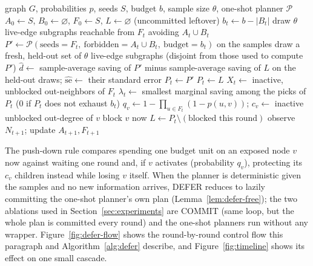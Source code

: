 \documentclass[11pt]{article}
\theoremstyle{definition}
\theoremstyle{remark}
\begin{document}
\begin{algorithm}[h]
\caption{DEFER}\label{alg:defer}
\begin{algorithmic}[1]
\Require graph $G$, probabilities $p$, seeds $S$, budget $b$, sample size
  $\theta$, one-shot planner $\mathcal P$
\State $A_0\gets S$, $B_0\gets\varnothing$, $F_0\gets S$, $L\gets\varnothing$ (uncommitted leftover)
  \State $b_t\gets b-|B_t|$
  \State draw $\theta$ live-edge subgraphs reachable from $F_t$ avoiding $A_t\cup B_t$
  \State $P'\gets\mathcal P(\text{seeds}=F_t,\ \text{forbidden}=A_t\cup B_t,\ \text{budget}=b_t)$ on the samples
  \State draw a fresh, held-out set of $\theta$ live-edge subgraphs (disjoint from those used to compute $P'$)
  \State $\hat d\gets$ sample-average saving of $P'$ minus sample-average saving of $L$ on the held-out draws; $\widehat{\mathrm{se}}\gets$ their standard error
   
    \State $P_t\gets P'$
  \Else
    \State $P_t\gets L$
  \EndIf
  \State $X_t\gets$ inactive, unblocked out-neighbors of $F_t$
  \State $\lambda_t\gets$ smallest marginal saving among the picks of $P_t$ (0 if $P_t$ does not exhaust $b_t$)
  \label{alg:pushdown-start}
    \State $q_v\gets 1-\prod_{u\in F_t}(1-p(u,v))$; $c_v\gets$ inactive unblocked out-degree of $v$
     
      \State block $v$ now
    \EndIf
  \EndFor\label{alg:pushdown-end}
  \State $L\gets P_t\setminus(\text{blocked this round})$
  \State observe $N_{t+1}$; update $A_{t+1},F_{t+1}$
\EndFor
\end{algorithmic}
\end{algorithm}

The push-down rule compares spending one budget unit on an exposed node $v$
now against waiting one round and, if $v$ activates (probability $q_v$),
protecting its $c_v$ children instead while losing $v$ itself. When the
planner is deterministic given the samples and no new information arrives,
DEFER reduces to lazily committing the one-shot planner's own plan
(Lemma~\ref{lem:defer-free}); the two ablations used in
Section~\ref{sec:experiments} are COMMIT (same loop, but the whole plan is
committed every round) and the one-shot planners run without any wrapper.
Figure~\ref{fig:defer-flow} shows the round-by-round control flow this
paragraph and Algorithm~\ref{alg:defer} describe, and Figure~\ref{fig:timeline} shows its effect on one small cascade.
\end{document}
